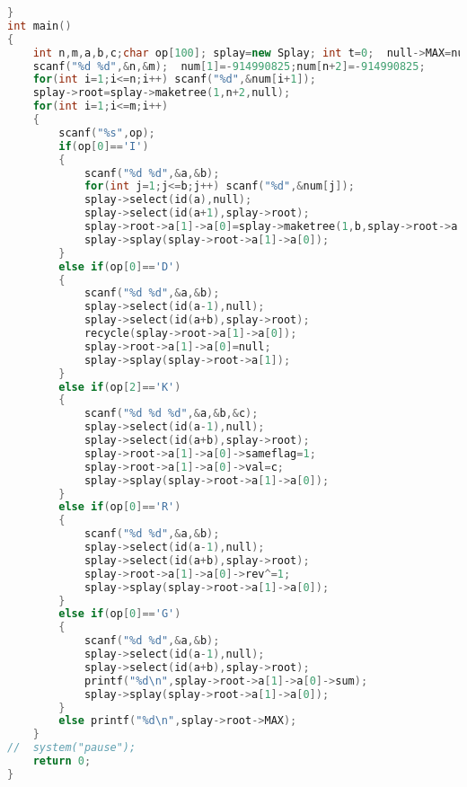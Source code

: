 \begin{lstlisting}[language=c++]
}
int main()
{
	int n,m,a,b,c;char op[100]; splay=new Splay; int t=0;  null->MAX=null->val=null->lmax=null->rmax=-914990825;
	scanf("%d %d",&n,&m);  num[1]=-914990825;num[n+2]=-914990825;
	for(int i=1;i<=n;i++) scanf("%d",&num[i+1]);
	splay->root=splay->maketree(1,n+2,null);
	for(int i=1;i<=m;i++)
	{
		scanf("%s",op);
		if(op[0]=='I')
		{
			scanf("%d %d",&a,&b);	
			for(int j=1;j<=b;j++) scanf("%d",&num[j]);
			splay->select(id(a),null);
			splay->select(id(a+1),splay->root);
			splay->root->a[1]->a[0]=splay->maketree(1,b,splay->root->a[1]);
			splay->splay(splay->root->a[1]->a[0]);
		}
		else if(op[0]=='D')
		{
			scanf("%d %d",&a,&b);
			splay->select(id(a-1),null);
			splay->select(id(a+b),splay->root);	
			recycle(splay->root->a[1]->a[0]);
			splay->root->a[1]->a[0]=null;
			splay->splay(splay->root->a[1]);
		}
		else if(op[2]=='K')
		{
			scanf("%d %d %d",&a,&b,&c);
			splay->select(id(a-1),null);
			splay->select(id(a+b),splay->root);
			splay->root->a[1]->a[0]->sameflag=1;
			splay->root->a[1]->a[0]->val=c;
			splay->splay(splay->root->a[1]->a[0]);	
		}
		else if(op[0]=='R')
		{
			scanf("%d %d",&a,&b);
			splay->select(id(a-1),null);
			splay->select(id(a+b),splay->root);
			splay->root->a[1]->a[0]->rev^=1;
			splay->splay(splay->root->a[1]->a[0]);
		}
		else if(op[0]=='G')
		{
			scanf("%d %d",&a,&b);
			splay->select(id(a-1),null);	
			splay->select(id(a+b),splay->root);
			printf("%d\n",splay->root->a[1]->a[0]->sum); 
			splay->splay(splay->root->a[1]->a[0]);
		}
		else printf("%d\n",splay->root->MAX);
	}	
//	system("pause");
	return 0;
}
    \end{lstlisting} 
